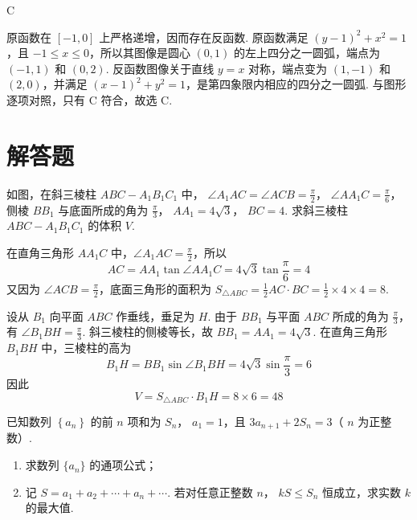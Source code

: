 \begin{answer}
C
\end{answer}

\begin{solution}
原函数在 \([-1,0]\) 上严格递增，因而存在反函数. 原函数满足 \((y-1)^2+x^2=1\)，且 \(-1\leqslant x\leqslant0\)，所以其图像是圆心 \((0,1)\) 的左上四分之一圆弧，端点为 \((-1,1)\) 和 \((0,2)\). 反函数图像关于直线 \(y=x\) 对称，端点变为 \((1,-1)\) 和 \((2,0)\)，并满足 \((x-1)^2+y^2=1\)，是第四象限内相应的四分之一圆弧. 与图形逐项对照，只有 C 符合，故选 C.
\end{solution}

\section{解答题}

\begin{problem}

如图，在斜三棱柱 \( ABC - A_1B_1C_1 \) 中， \( \angle A_1AC = \angle ACB = \frac{\pi}{2} \)， \( \angle AA_1C = \frac{\pi}{6} \)，侧棱 \(BB_1\) 与底面所成的角为 \( \frac{\pi}{3} \)， \( AA_1 = 4\sqrt{3} \)， \( BC = 4 \). 求斜三棱柱 \( ABC - A_1B_1C_1 \) 的体积 \(V\).

\end{problem}

\begin{solution}
在直角三角形 \(AA_1C\) 中，\(\angle A_1AC=\frac\pi2\)，所以
\[
AC=AA_1\tan\angle AA_1C=4\sqrt3\tan\frac\pi6=4
\]
又因为 \(\angle ACB=\frac\pi2\)，底面三角形的面积为 \(S_{\triangle ABC}=\frac12AC\cdot BC=\frac12\times4\times4=8\).

设从 \(B_1\) 向平面 \(ABC\) 作垂线，垂足为 \(H\). 由于 \(BB_1\) 与平面 \(ABC\) 所成的角为 \(\frac\pi3\)，有 \(\angle B_1BH=\frac\pi3\). 斜三棱柱的侧棱等长，故 \(BB_1=AA_1=4\sqrt3\). 在直角三角形 \(B_1BH\) 中，三棱柱的高为
\[
B_1H=BB_1\sin\angle B_1BH=4\sqrt3\sin\frac\pi3=6
\]
因此
\[
V=S_{\triangle ABC}\cdot B_1H=8\times6=48
\]
\end{solution}

\begin{problem}

已知数列 \( \left\{a_{n}\right\} \) 的前 \(n\) 项和为 \( S_{n} \)， \( a_{1}=1 \)，且 \( 3a_{n+1}+2S_{n}=3 \)（ \( n \) 为正整数）.

\begin{enumerate}
\item 求数列 \( \{a_{n}\} \) 的通项公式；
\item 记 \( S = a_1 + a_2 + \cdots + a_n + \cdots \). 若对任意正整数 \( n \)， \( kS \leq S_n \) 恒成立，求实数 \( k \) 的最大值.
\end{enumerate}
\end{problem}

